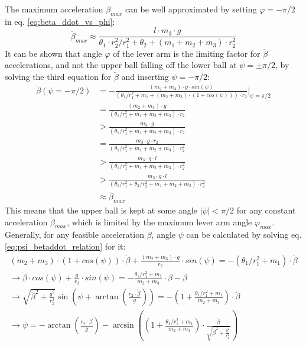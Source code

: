 \documentclass{article}
\begin{document}
The maximum acceleration $\ddot{\beta}_{max}$ can be well approximated by setting $\varphi = -\pi/2$ in eq. \ref{eq:beta_ddot_vs_phi}:
\begin{equation}
\ddot{\beta}_{max} \approx \frac{l \cdot m_3 \cdot g}{\theta_1 \cdot r_2^2/r_1^2 + \theta_2 + (m_1 + m_2 + m_3) \cdot r_2^2}
\label{eq:beta_ddot_max}
\end{equation}
It can be shown that angle $\varphi$ of the lever arm is the limiting factor for $\ddot{\beta}$ accelerations, and not the upper ball falling off the lower ball at $\psi = \pm \pi/2$, by solving the third equation for $\ddot{\beta}$ and inserting $\psi = -\pi/2$:
\begin{align*}
\ddot{\beta}(\psi=-\pi/2) &= -\frac{(m_2+m_3) \cdot g \cdot sin(\psi)}{(\theta_1/r_1^2  + m_1 + (m_2+m_3) \cdot (1+cos(\psi))) \cdot r_2} \Big|_{\psi=\pi/2} \\
&= \frac{(m_2+m_3) \cdot g}{(\theta_1/r_1^2  + m_1 + m_2 + m_3) \cdot r_2} \\
&> \frac{m_3 \cdot g}{(\theta_1/r_1^2  + m_1 + m_2 + m_3) \cdot r_2} \\
&= \frac{m_3 \cdot g \cdot r_2}{(\theta_1/r_1^2  + m_1 + m_2 + m_3) \cdot r_2^2} \\
&> \frac{m_3 \cdot g \cdot l}{(\theta_1/r_1^2  + m_1 + m_2 + m_3) \cdot r_2^2} \\
&> \frac{m_3 \cdot g \cdot l}{(\theta_1/r_1^2 + \theta_2/r_2^2 + m_1 + m_2 + m_3) \cdot r_2^2} \\
&\approx \ddot{\beta}_{max}
\end{align*}
This means that the upper ball is kept at some angle $|\psi|<\pi/2$ for any constant acceleration $\ddot{\beta}_{max}$, which is limited by the maximum lever arm angle $\varphi_{max}$.
Generally, for any feasible acceleration $\ddot{\beta}$, angle $\psi$ can be calculated by solving eq. \ref{eq:psi_betaddot_relation} for it:
\begin{align}
(m_2+m_3) \cdot (1+cos(\psi)) \cdot \ddot{\beta} + \frac{(m_2+m_3) \cdot g}{r_2} \cdot sin(\psi) = -(\theta_1/r_1^2  + m_1) \cdot \ddot{\beta} \nonumber \\
\rightarrow \ddot{\beta} \cdot cos(\psi) + \frac{g}{r_2} \cdot sin(\psi) = -\frac{\theta_1/r_1^2  + m_1}{m_2+m_3} \cdot \ddot{\beta} - \ddot{\beta} \nonumber \\
\rightarrow \sqrt{\ddot{\beta}^2 + \frac{g^2}{r_2^2}} \sin{\left( \psi + \arctan{\left( \frac{r_2 \cdot \ddot{\beta}}{g}\right)}\right)} = -\left( 1 + \frac{\theta_1/r_1^2  + m_1}{m_2+m_3} \right) \cdot \ddot{\beta} \nonumber \\
\rightarrow \psi = - \arctan{\left( \frac{r_2 \cdot \ddot{\beta}}{g}\right)} -\arcsin{\left(\left( 1 + \frac{\theta_1/r_1^2  + m_1}{m_2+m_3} \right) \cdot \frac{\ddot{\beta}}{\sqrt{\ddot{\beta}^2 + \frac{g^2}{r_2^2}}} \right)}
\label{eq:psi_vs_beta_ddot}
\end{align}
\end{document}
